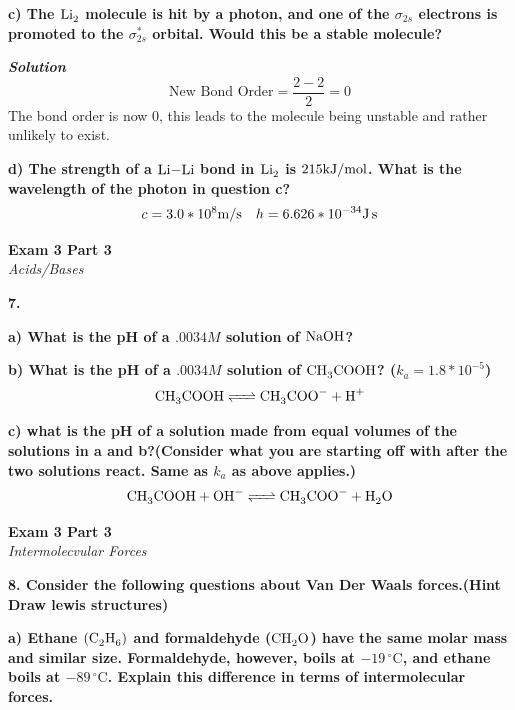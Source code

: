 \documentclass{article}
\begin{document}
    \textbf{c) The $\ce{Li2}$ molecule is hit by a photon, and one of the $\sigma_{2s}$ electrons is promoted to the $\sigma_{2s}^{*}$ orbital. Would this be a stable molecule? }

    \textbf{\textit{Solution}}
    $$\text{New Bond Order} = \dfrac{2 - 2}{2} = 0$$
    The bond order is now 0, this leads to the molecule being unstable and rather unlikely to exist.


    \textbf{d) The strength of a $\ce{Li-Li}$ bond in $\ce{Li2}$ is $215 \si[per-mode=symbol]{\kilo\joule\per\mole}$. What is the wavelength of the photon in question c?}
    $$ c = 3.0 * 10^{8} \si[per-mode=symbol]{\meter\per\second} \quad h = 6.626 * 10^{-34} \si{\joule\second}$$

    \pagebreak

    \begin{center}
        \textbf{Exam 3 Part 3}\\
        \textit{Acids/Bases}
    \end{center}
    \textbf{7.}

    \textbf{a) What is the pH of a $.0034 M$ solution of         $\ce{NaOH}$?}

    \textbf{b) What is the pH of a $.0034 M$ solution of         $\ce{CH3COOH}$? ($k_{a} = 1.8 * 10^{-5}$)}
    $$\ce{CH3COOH <=> CH3COO- + H+}$$

    \textbf{c) what is the pH of a solution made from equal volumes of the solutions in a and b?(Consider what you are starting off with after the two solutions react. Same as $k_{a}$ as above applies.)}
    $$\ce{CH3COOH + OH- <=> CH3COO- + H2O}$$

    \pagebreak

    \begin{center}
        \textbf{Exam 3 Part 3}\\
        \textit{Intermolecvular Forces}
    \end{center}
    \textbf{8. Consider the following questions about Van Der Waals forces.(Hint Draw lewis structures)}

    \textbf{a) Ethane $(\ce{C2H6})$ and formaldehyde ($\ce{CH2O}$) have the same molar mass and similar size. Formaldehyde, however, boils at $-19\,^{\circ}\mathrm{C}$, and ethane boils at $-89\,^{\circ}\mathrm{C}$. Explain this difference in terms of intermolecular forces.}
\end{document}
